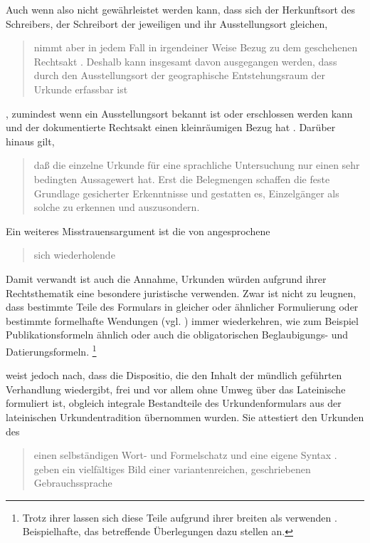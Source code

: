 Auch wenn also nicht gewährleistet werden kann, dass sich der Herkunftsort des
Schreibers, der Schreibort der jeweiligen
 und ihr Ausstellungsort gleichen,
\blockcquote[331--332]{ganslmayeretal2003}{nimmt 
aber in jedem Fall in irgendeiner Weise Bezug zu dem geschehenen Rechtsakt
\textelp{}. Deshalb kann insgesamt davon ausgegangen werden, dass durch den
Ausstellungsort der geographische Entstehungsraum der
Urkunde erfassbar ist}, zumindest wenn ein Ausstellungsort bekannt ist oder
erschlossen werden kann und der dokumentierte Rechtsakt einen kleinräumigen
Bezug hat \autocite[vgl.~auch][\RN{29}--\RN{35}]{deboorhaacke1957}. Darüber
hinaus gilt, \blockcquote[122]{deboor1974}{daß die einzelne Urkunde für eine
sprachliche Untersuchung nur einen sehr bedingten Aussagewert hat. Erst die
Belegmengen schaffen die feste Grundlage gesicherter Erkenntnisse und gestatten
es, Einzelgänger als solche zu erkennen und auszusondern.}

Ein weiteres Misstrauensargument ist die von
\citet[1311]{wegera2000} angesprochene \blockquote{sich wiederholende
}. Damit verwandt ist auch die Annahme,
Urkunden würden aufgrund ihrer Rechtsthematik eine besondere
juristische  verwenden. Zwar ist nicht zu leugnen, dass
bestimmte Teile des Formulars in gleicher oder ähnlicher Formulierung oder
bestimmte formelhafte Wendungen (vgl. ) immer
wiederkehren, wie zum Beispiel Publikationsformeln ähnlich   oder auch die
obligatorischen Beglaubigungs- und Datierungsformeln.%
%
	\footnote{%
	Trotz ihrer  lassen sich diese Teile aufgrund ihrer
	breiten  als  verwenden
	\autocite[siehe][]{cysouwwaelchli2007}. Beispielhafte, das \CAO{}
	betreffende Überlegungen dazu stellen
	\citet[174--175]{beckerschallert2022b} an.}

\citet[13, 25--38]{schulze2011} weist jedoch nach, dass die Dispositio, die den
Inhalt der mündlich geführten Verhandlung wiedergibt, frei und
vor allem ohne Umweg über das Lateinische
formuliert ist, obgleich integrale Bestandteile des
Urkundenformulars aus der lateinischen
Urkundentradition übernommen wurden. Sie attestiert den Urkunden des \CAO{}
\blockcquote[3]{schulze1994}{einen selbständigen Wort- und Formelschatz und
eine eigene Syntax \textelp{}.  geben ein vielfältiges
Bild einer variantenreichen, geschriebenen
Gebrauchs\-sprache}.

